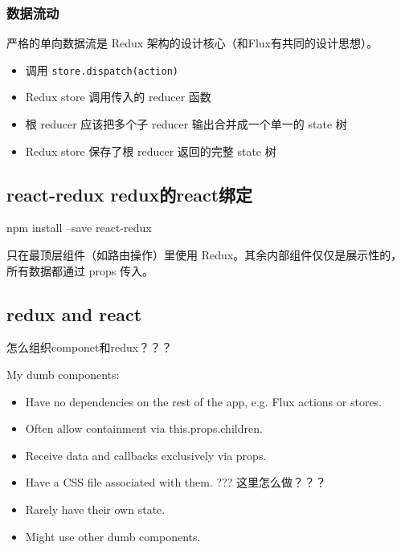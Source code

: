 \subsubsection{数据流动}

严格的单向数据流是 Redux 架构的设计核心（和Flux有共同的设计思想）。
\begin{itemize}

\item 调用 \lstinline$store.dispatch(action)$

\item Redux store 调用传入的 reducer 函数

\item 根 reducer 应该把多个子 reducer 输出合并成一个单一的 state 树

\item Redux store 保存了根 reducer 返回的完整 state 树

\end{itemize}

\subsection{react-redux redux的react绑定}


\begin{Bash}[需要单独安装]
npm install --save react-redux
\end{Bash}

只在最顶层组件（如路由操作）里使用 Redux。其余内部组件仅仅是展示性的，所有数据都通过 props 传入。


\subsection{redux and react}

怎么组织componet和redux？？？


My dumb components:
\begin{itemize}
\item Have no dependencies on the rest of the app, e.g. Flux actions or stores.
\item Often allow containment via this.props.children.
\item Receive data and callbacks exclusively via props.
\item Have a CSS file associated with them. ??? 这里怎么做？？？
\item Rarely have their own state.
\item Might use other dumb components.
\end{itemize}


